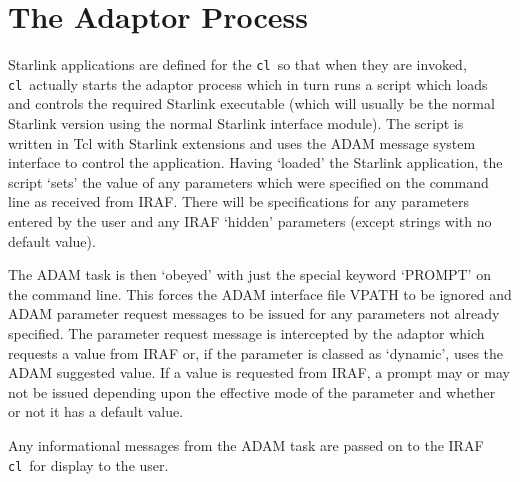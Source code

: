 \documentclass[twoside,11pt]{article}
\newcommand{\htmlref}[2]{#1}
\newcommand{\xref}[3]{#1}
\newcommand{\xlabel}[1]{}
\newcommand{\cl}{\texttt{cl}}
\begin{document}
\section{\xlabel{the_adaptor_process}The Adaptor Process}
Starlink applications are defined for the \cl\ so that when they are invoked,
\cl\ actually starts the adaptor process which in turn runs a script which 
loads and controls the required Starlink executable (which will usually be the
normal Starlink version using the normal Starlink interface module).
The script is written in
\xref{Tcl with Starlink extensions}{sun186}{}
and uses the ADAM message system interface to control the application.
Having `loaded' the Starlink application, the script `sets' the value of 
any parameters which were specified on the command line as received from IRAF.
There will be specifications for any parameters entered by the user and any 
IRAF `hidden' parameters (except strings with no default value). 

The ADAM task is then `obeyed' with just the special keyword `PROMPT' on the 
command line.
This forces the ADAM interface file VPATH to be ignored and ADAM parameter 
request messages to be issued for any parameters not already specified.
The parameter request message is intercepted by the adaptor which requests
a value from IRAF or, if the parameter is classed as 
\htmlref{`dynamic'}{dynamic_parameters},
uses the ADAM 
suggested value. 
If a value is requested from IRAF, a prompt may or may not be issued depending
upon the effective mode of the parameter and whether or not it has a default
value.

Any informational messages from the ADAM task are passed on to the IRAF 
\cl\ for display to the user.
\end{document}
